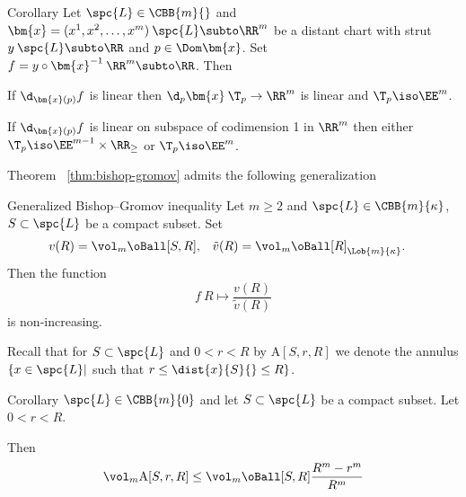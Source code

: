 \begin{thm}{Corollary}
Let $\spc{L}\in\CBB{m}{}$
and $\bm{x}=(x^1,x^2,\dots,x^m)\:\spc{L}\subto\RR^m$ be a distant chart with strut $y\:\spc{L}\subto\RR$
and $p\in\Dom\bm{x}$.
Set $f=y\circ\bm{x}^{-1}\:\RR^m\subto \RR$.
Then
\begin{subthm}{}
If $\d_{\bm{x}(p)}f$ is linear 
then  $\d_p\bm{x}\:\T_p\to \RR^m$ is linear and $\T_p\iso \EE^m$.
\end{subthm}

\begin{subthm}{}
If $\d_{\bm{x}(p)}f$ is linear on subspace of codimension 1 in $\RR^m$ then either $\T_p\iso \EE^{m-1}\times \RR_\ge$ or $\T_p\iso \EE^m$.
\end{subthm}
\end{thm}

















Theorem ~\ref{thm:bishop-gromov} admits the following generalization


\begin{thm}{Generalized Bishop--Gromov inequality}\label{thm:bishop-gromov-gen}
Let $m\ge 2$ and 
$\spc{L}\in\CBB{m}{\kappa}$, 
$S\subset \spc{L}$ be a compact subset.
Set
\begin{align*}
v(R)&=\vol_m\oBall[S,R],
&
\tilde v(R)&=\vol_m\oBall[ R]_{\Lob{m}{\kappa}}.
\end{align*}
Then the function
\[f\:R\mapsto \frac{v(R)}{\tilde v(R)}\] 
is non-increasing.
\end{thm}
Recall that for $S\subset \spc{L}$ and $0<r<R$  by  $\mathrm{A}[S,r,R]$  we denote the annulus $\{x\in\spc{L}|$ such that $r\le \dist{x}{S}{}\le R\}$.
\begin{thm}{Corollary}\label{cor:bishop-gromov-annulus}
$\spc{L}\in\CBB{m}{0}$ and let $S\subset \spc{L}$ be a compact subset. Let $0<r<R$.

Then 
\[
\vol_m \mathrm{A}[S,r,R]\le   \vol_m\oBall[S,R]\frac{R^m-r^m}{R^m}
\]
\end{thm}

